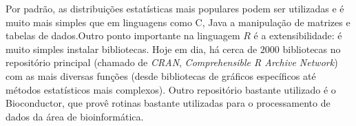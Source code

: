 Por padrão, as distribuições estatísticas mais populares podem ser utilizadas e é muito mais simples que em 
linguagens como C, Java a manipulação de matrizes e tabelas de dados.Outro ponto importante na linguagem $R$ 
é a extensibilidade: é muito simples instalar bibliotecas. Hoje em dia, há
cerca de $2000$ bibliotecas no repositório principal (chamado de \emph{CRAN}, 
\textit{Comprehensible R Archive Network}) com as mais diversas funções 
(desde bibliotecas de gráficos específicos até métodos estatísticos mais complexos). 
Outro repositório bastante utilizado é o Bioconductor, que provê rotinas bastante utilizadas para o processamento
de dados da área de bioinformática.

